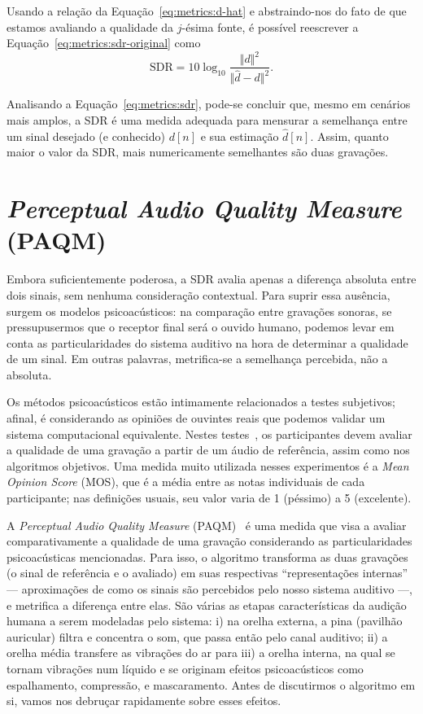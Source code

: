 Usando a relação da Equação~\eqref{eq:metrics:d-hat} e abstraindo-nos do fato de que estamos avaliando a qualidade da $j$-ésima fonte, é possível reescrever a Equação~\eqref{eq:metrics:sdr-original} como
\begin{equation}
    \text{SDR} = 10 \log_{10} \frac{\Vert d \Vert^2}{\Vert \hat{d} - d \Vert^2}.
    \label{eq:metrics:sdr}
\end{equation}

Analisando a Equação~\eqref{eq:metrics:sdr}, pode-se concluir que, mesmo em cenários mais amplos, a SDR é uma medida adequada para mensurar a semelhança entre um sinal desejado (e conhecido) $d[n]$ e sua estimação $\hat{d}[n]$. Assim, quanto maior o valor da SDR, mais numericamente semelhantes são duas gravações.

\section{\textit{Perceptual Audio Quality Measure} (PAQM)}
\label{section:metrics:paqm}

Embora suficientemente poderosa, a SDR avalia apenas a diferença absoluta entre dois sinais, sem nenhuma consideração contextual. Para suprir essa ausência, surgem os modelos psicoacústicos: na comparação entre gravações sonoras, se pressupusermos que o receptor final será o ouvido humano, podemos levar em conta as particularidades do sistema auditivo na hora de determinar a qualidade de um sinal. Em outras palavras, metrifica-se a semelhança percebida, não a absoluta.

Os métodos psicoacústicos estão intimamente relacionados a testes subjetivos; afinal, é considerando as opiniões de ouvintes reais que podemos validar um sistema computacional equivalente. Nestes testes~\cite{bech-2006}, os participantes devem avaliar a qualidade de uma gravação a partir de um áudio de referência, assim como nos algoritmos objetivos. Uma medida muito utilizada nesses experimentos é a \textit{Mean Opinion Score} (MOS), que é a média entre as notas individuais de cada participante; nas definições usuais, seu valor varia de 1 (péssimo) a 5 (excelente).

A \textit{Perceptual Audio Quality Measure} (PAQM)~\cite{beerends-1992} é uma medida que visa a avaliar comparativamente a qualidade de uma gravação considerando as particularidades psicoacústicas mencionadas. Para isso, o algoritmo transforma as duas gravações (o sinal de referência e o avaliado) em suas respectivas ``representações internas'' --- aproximações de como os sinais são percebidos pelo nosso sistema auditivo ---, e metrifica a diferença entre elas. São várias as etapas características da audição humana a serem modeladas pelo sistema: i) na orelha externa, a pina (pavilhão auricular) filtra e concentra o som, que passa então pelo canal auditivo; ii) a orelha média transfere as vibrações do ar para iii) a orelha interna, na qual se tornam vibrações num líquido e se originam efeitos psicoacústicos como espalhamento, compressão, e mascaramento. Antes de discutirmos o algoritmo em si, vamos nos debruçar rapidamente sobre esses efeitos.

